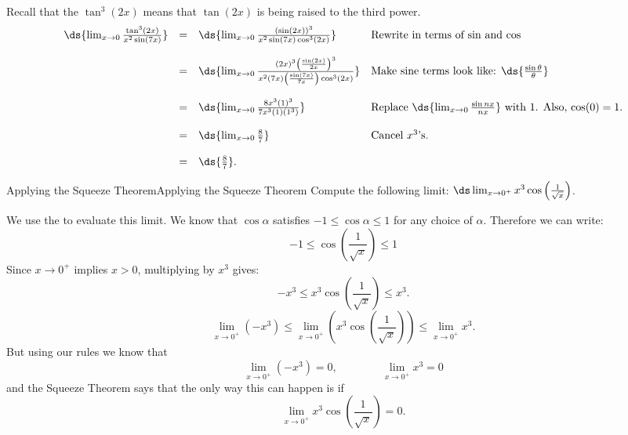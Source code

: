 \begin{solution} 
Recall that the $\tan^3(2x)$ means that $\tan(2x)$ is being raised to the third power.
$$\begin{array}{rcll}
\ds{\lim_{x\to 0}\frac{\tan^3(2x)}{x^2\sin(7x)}}&=& \ds{\lim_{x\to 0}\frac{(\sin(2x))^3}{x^2\sin(7x)\cos^3(2x)}}
& \mbox{Rewrite in terms of $\sin$ and $\cos$}\\
\\
~&=&\ds{\lim_{x\to 0}\frac{(2x)^3\left(\frac{\sin(2x)}{2x}\right)^3}{x^2(7x)\left(\frac{\sin(7x)}{7x}\right)\cos^3(2x)}}
& \mbox{Make sine terms look like: $\ds{\frac{\sin\theta}{\theta}}$}\\
\\
~&=&\ds{\lim_{x\to 0}\frac{8x^3(1)^3}{7x^3(1)(1^3)}} 
& \mbox{Replace $\ds{\lim_{x\to 0}\frac{\sin nx}{nx}}$ with $1$. Also, $\cos(0)=1$.}\\
\\
~&=&\ds{\lim_{x\to 0}\frac{8}{7}}&\mbox{Cancel $x^3$'s.}\\
\\
~&=&\ds{\frac{8}{7}}.\\
\end{array}$$
\end{solution}

\begin{example}{Applying the Squeeze Theorem}{Applying the Squeeze Theorem}
Compute the following limit:
$\ds\lim_{x\to 0^+}x^3\cos\left(\frac{1}{\sqrt{x}}\right)$.
\end{example}

\begin{solution} 
We use the  to evaluate this limit.
We know that $\cos\alpha$ satisfies $-1\leq\cos\alpha\leq 1$ for any choice of $\alpha$.
Therefore we can write:
$$-1\leq\cos\left(\frac{1}{\sqrt{x}}\right)\leq 1$$
Since $x\to 0^+$ implies $x>0$, multiplying by $x^3$ gives:
$$-x^3\leq x^3\cos\left(\frac{1}{\sqrt{x}}\right)\leq x^3.$$
$$\lim_{x\to 0^+}(-x^3)\leq \lim_{x\to 0^+}\left(x^3\cos\left(\frac{1}{\sqrt{x}}\right)\right)\leq\lim_{x\to 0^+} x^3.$$
But using our rules we know that
$$\lim_{x\to 0^+}(-x^3)=0,\qquad\qquad \lim_{x\to 0^+} x^3=0$$
and the Squeeze Theorem says that the only way this can happen is if
$$\lim_{x\to 0^+}x^3\cos\left(\frac{1}{\sqrt{x}}\right)=0.$$
\end{solution}



